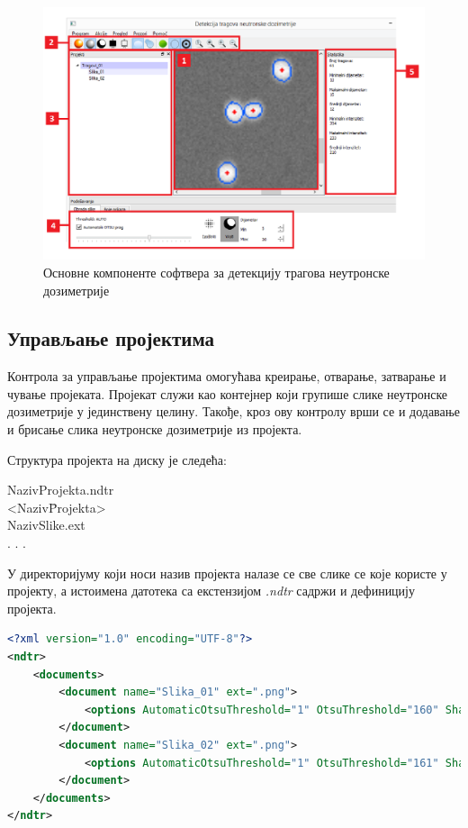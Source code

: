 \documentclass[12pt,a4paper,serbian,oneside]{book}
\begin{document}
\begin{figure}[H]
\begin{center}
\includegraphics[width=150mm]{images/softver2.PNG}
\end{center}
\caption{Основне компоненте софтвера за детекцију трагова неутронске дозиметрије}
\label{fig:softver2}
\end{figure}

\subsection{Управљање пројектима}

Контрола за управљање пројектима омогућава креирање, отварање, затварање и чување пројеката.
Пројекат служи као контејнер који групише слике неутронске дозиметрије у јединствену целину.
Такође, кроз ову контролу врши се и додавање и брисање слика неутронске дозиметрије из пројекта.

Структура пројекта на диску је следећа:

\begin{tabbing}
NazivProjekta.ndtr \\
<Naziv\= Projekta>   \\
\>    NazivSlike.ext \\
\>    . . . \\
\end{tabbing}

У директоријуму који носи назив пројекта налазе се све слике се које користе у пројекту, а истоимена датотека са екстензијом \textit{.ndtr} садржи и дефиницију пројекта.

\begin{lstlisting}[language=Xml,label=lst:Project,caption=Пример дефиниције пројекта]
<?xml version="1.0" encoding="UTF-8"?>
<ndtr>
    <documents>
        <document name="Slika_01" ext=".png">
            <options AutomaticOtsuThreshold="1" OtsuThreshold="160" Sharpen="0" WoB="1" MinTraceDiameter="5" MaxTraceDiameter="40"/>
        </document>
        <document name="Slika_02" ext=".png">
            <options AutomaticOtsuThreshold="1" OtsuThreshold="161" Sharpen="0" WoB="1" MinTraceDiameter="5" MaxTraceDiameter="40"/>
        </document>
    </documents>
</ndtr>
\end{lstlisting}
\end{document}

